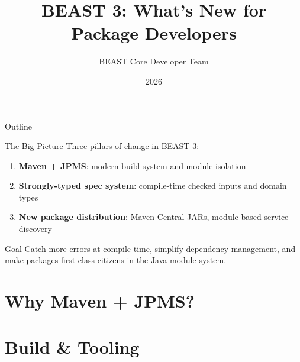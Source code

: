 \documentclass[aspectratio=169,11pt]{beamer}
\title{BEAST 3: What's New for Package Developers}
\author{BEAST Core Developer Team}
\date{2026}
\begin{document}

\begin{frame}
\titlepage
\end{frame}

\begin{frame}{Outline}
\tableofcontents
\end{frame}

\begin{frame}{The Big Picture}
Three pillars of change in BEAST 3:
\vspace{1em}
\begin{enumerate}
\item \textbf{Maven + JPMS}: modern build system and module isolation
\item \textbf{Strongly-typed spec system}: compile-time checked inputs and domain types
\item \textbf{New package distribution}: Maven Central JARs, module-based service discovery
\end{enumerate}
\vspace{1em}
\begin{block}{Goal}
Catch more errors at compile time, simplify dependency management, and make packages first-class citizens in the Java module system.
\end{block}
\end{frame}

\section{Why Maven + JPMS?}



\section{Build \& Tooling}
\end{document}
